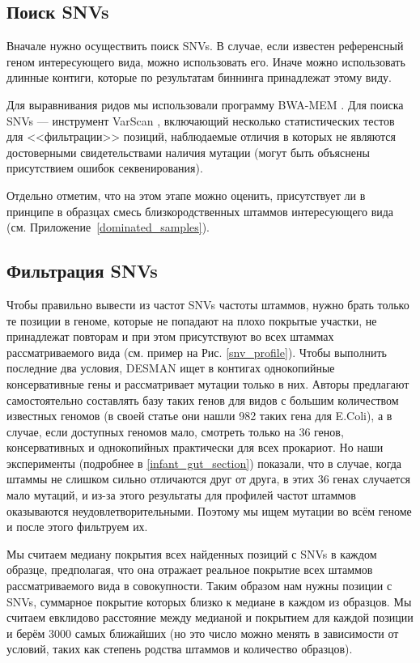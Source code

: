 \documentclass{spbau-diploma}
\begin{document}
\subsection{Поиск SNVs}

Вначале нужно осуществить поиск SNVs. В случае, если известен референсный геном интересующего вида, можно использовать его. Иначе можно использовать длинные контиги, которые по результатам биннинга принадлежат этому виду.

Для выравнивания ридов мы использовали программу BWA-MEM \cite{bwa_mem}. Для поиска SNVs --- инструмент VarScan \cite{VarScan}, включающий несколько статистических тестов для <<фильтрации>> позиций, наблюдаемые отличия в которых не являются достоверными свидетельствами наличия мутации (могут быть объяснены присутствием ошибок секвенирования). 

Отдельно отметим, что на этом этапе можно оценить, присутствует ли в принципе в образцах смесь близкородственных штаммов интересующего вида (см. Приложение~\ref{dominated_samples}).

\subsection{Фильтрация SNVs} 


Чтобы правильно вывести из частот SNVs частоты штаммов, нужно брать только те позиции в геноме, которые не попадают на плохо покрытые участки, не принадлежат повторам и при этом присутствуют во всех штаммах рассматриваемого вида (см. пример на Рис. \ref{snv_profile}). Чтобы выполнить последние два условия, DESMAN ищет в контигах однокопийные консервативные гены и рассматривает мутации только в них. Авторы предлагают самостоятельно составлять базу таких генов для видов с большим количеством известных геномов (в своей статье они нашли 982 таких гена для E.Coli), а в случае, если доступных геномов мало, смотреть только на 36 генов, консервативных и однокопийных практически для всех прокариот. Но наши эксперименты (подробнее в \ref{infant_gut_section}) показали, что в случае, когда штаммы не слишком сильно отличаются друг от друга, в этих 36 генах случается мало мутаций, и из-за этого результаты для профилей частот штаммов оказываются неудовлетворительными. Поэтому мы ищем мутации во всём геноме и после этого фильтруем их.

Мы считаем медиану покрытия всех найденных позиций с SNVs в каждом образце, предполагая, что она отражает реальное покрытие всех штаммов рассматриваемого вида в совокупности. Таким образом нам нужны позиции с SNVs, суммарное покрытие которых близко к медиане в каждом из образцов. Мы считаем евклидово расстояние между медианой и покрытием для каждой позиции и берём 3000 самых ближайших (но это число можно менять в зависимости от условий, таких как степень родства штаммов и количество образцов).
\end{document}
